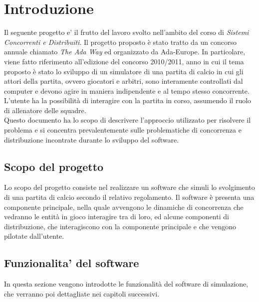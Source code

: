 
\section{Introduzione}
\label{sec:introduzione}

Il seguente progetto e' il frutto del lavoro svolto nell'ambito del corso di \emph{Sistemi Concorrenti e Distribuiti}. Il progetto proposto \`{e} stato tratto da un concorso annuale chiamato \emph{The Ada Way} ed organizzato da Ada-Europe. In particolare, viene fatto riferimento all'edizione del concorso 2010/2011, anno in cui il tema proposto \`{e} stato lo sviluppo di un simulatore di una partita di calcio in cui gli attori della partita, ovvero giocatori e arbitri, sono interamente controllati dal computer e devono agire in maniera indipendente e al tempo stesso concorrente. L'utente ha la possibilit\`{a} di interagire con la partita in corso, assumendo il ruolo di allenatore delle squadre.\\

Questo documento ha lo scopo di descrivere l'approccio utilizzato per risolvere il problema e si concentra prevalentemente sulle problematiche di concorrenza e distribuzione incontrate durante lo sviluppo del software.

\subsection{Scopo del progetto}
\label{sec:scopo_del_progetto}

Lo scopo del progetto consiste nel realizzare un software che simuli lo svolgimento di una partita di calcio secondo il relativo regolamento. Il software \`{e} presenta una componente principale, nella quale avvengono le dinamiche di concorrenza che vedranno le entit\`{a} in gioco interagire tra di loro, ed alcune componenti di distribuzione, che interagiscono con la componente principale e che vengono pilotate dall'utente.

\subsection{Funzionalita' del software}
\label{sec:funzionalita_del_software}

In questa sezione vengono introdotte le funzionalit\`{a} del software di simulazione, che verranno poi dettagliate nei capitoli successivi.

